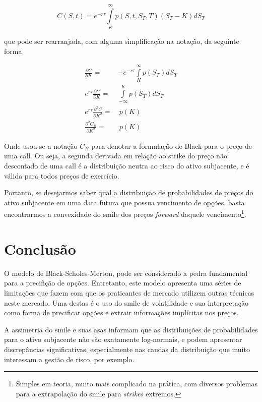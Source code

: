 \documentclass[]{book}
\let\rmarkdownfootnote\footnote%
\def\footnote{\protect\rmarkdownfootnote}
\begin{document}
\begin{equation}
C(S, t)=e^{-r\tau}\int\limits_{K}^\infty p(S,t,S_T,T)(S_T-K)dS_T
\end{equation}

que pode ser rearranjada, com alguma simplificação na notação, da
seguinte forma.

\begin{equation}
\begin{aligned}
\frac{\partial C}{\partial K}=& -e^{-r\tau}\int\limits_{K}^\infty p(S_T)dS_T\\
e^{r\tau}\frac{\partial C}{\partial K}=& \int\limits_{-\infty}^K p(S_T)dS_T\\
e^{r\tau}\frac{\partial^2 C}{\partial K^2}=& \ p(K)\\
\frac{\partial^2 C_B}{\partial K^2}=& \ p(K)
\end{aligned}
\label{eq:distimplicita}
\end{equation}

Onde usou-se a notação \(C_B\) para denotar a formulação de Black para o
preço de uma call. Ou seja, a segunda derivada em relação ao strike do
preço não descontado de uma call é a distribuição neutra ao risco do
ativo subjacente, e é válida para todos preços de exercício.

Portanto, se desejarmos saber qual a distribuição de probabilidades de
preços do ativo subjacente em uma data futura que possua vencimento de
opções, basta encontrarmos a convexidade do smile dos preços
\emph{forward} daquele vencimento\footnote{Simples em teoria, muito mais
  complicado na prática, com diversos problemas para a extrapolação do
  smile para \emph{strikes} extremos.}.

\section{Conclusão}\label{conclusao}

O modelo de Black-Scholes-Merton, pode ser considerado a pedra
fundamental para a precifição de opções. Entretanto, este modelo
apresenta uma séries de limitações que fazem com que os praticantes de
mercado utilizem outras técnicas neste mercado. Uma destas é o uso do
smile de volatilidade e sua interpretação como forma de precificar
opções e extrair informações implícitas nos preços.

A assimetria do smile e suas asas informam que as distribuições de
probabilidades para o ativo subjacente não são exatamente log-normais, e
podem apresentar discrepâncias significativas, especialmente nas caudas
da distribuição que muito interessam a gestão de risco, por exemplo.
\end{document}
